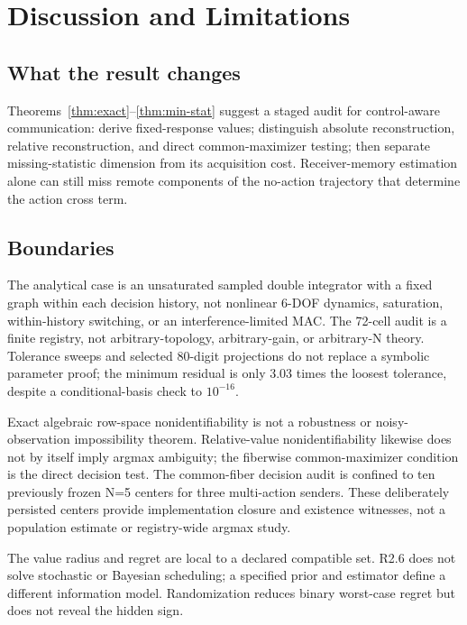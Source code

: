 \documentclass[10pt,twocolumn,twoside]{IEEEtran}
\begin{document}
\section{Discussion and Limitations}

\subsection{What the result changes}

Theorems~\ref{thm:exact}--\ref{thm:min-stat} suggest a staged audit for
control-aware communication: derive fixed-response values; distinguish
absolute reconstruction, relative reconstruction, and direct common-maximizer
testing; then separate missing-statistic dimension from its acquisition cost.
Receiver-memory estimation alone can still miss remote components of the
no-action trajectory that determine the action cross term.

\subsection{Boundaries}

The analytical case is an unsaturated sampled double integrator with a fixed
graph within each decision history, not nonlinear 6-DOF dynamics, saturation,
within-history switching, or an interference-limited MAC.  The 72-cell audit
is a finite registry, not arbitrary-topology, arbitrary-gain, or arbitrary-N
theory.  Tolerance sweeps and selected 80-digit projections do not replace a
symbolic parameter proof; the minimum residual is only 3.03 times the loosest
tolerance, despite a conditional-basis check to \(10^{-16}\).

Exact algebraic row-space nonidentifiability is not a robustness or noisy-
observation impossibility theorem.  Relative-value nonidentifiability likewise
does not by itself imply argmax ambiguity; the fiberwise common-maximizer
condition is the direct decision test.  The common-fiber decision audit is
confined to ten previously frozen N=5 centers for three multi-action senders.
These deliberately persisted centers provide implementation closure and
existence witnesses, not a population estimate or registry-wide argmax study.

The value radius and regret are local to a declared compatible set.  R2.6 does
not solve stochastic or Bayesian scheduling; a specified prior and estimator
define a different information model.  Randomization reduces binary worst-case
regret but does not reveal the hidden sign.
\end{document}
